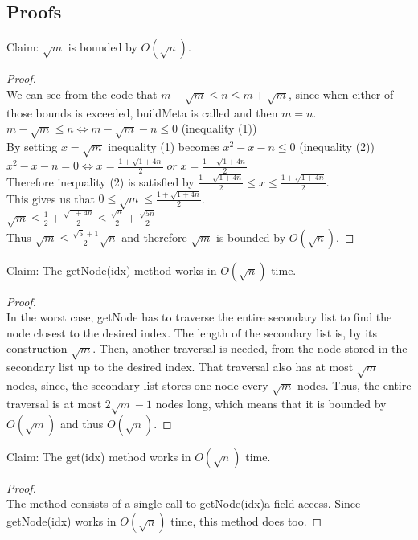 \documentclass[10pt]{article}
\begin{document}
\subsection{Proofs}
Claim: $\sqrt{m}$ is bounded by $O(\sqrt{n})$.
\begin{proof}
	$ $\\
	We can see from the code that $m - \sqrt{m} \leq n \leq m + \sqrt{m}$, since when either of those bounds is exceeded, buildMeta is called and then $m = n$.\\
	$m - \sqrt{m} \leq n \iff m - \sqrt{m} - n \leq 0$ (inequality (1))\\
	By setting $x = \sqrt{m}$ inequality (1) becomes $x^2 - x - n \leq 0$ (inequality (2))\\
	$x^2 - x - n = 0 \iff x = \frac{1 + \sqrt{1 + 4n}}{2} \; or \; x = \frac{1 - \sqrt{1 + 4n}}{2}$\\
	Therefore inequality (2) is satisfied by $\frac{1 - \sqrt{1 + 4n}}{2} \leq x \leq \frac{1 + \sqrt{1 + 4n}}{2}$.\\
	This gives us that $0 \leq \sqrt{m} \leq \frac{1 + \sqrt{1 + 4n}}{2}$.\\
	$\sqrt{m} \leq \frac{1}{2} + \frac{\sqrt{1 + 4n}}{2} \leq \frac{\sqrt{n}}{2} + \frac{\sqrt{5n}}{2}$\\
	Thus $\sqrt{m} \leq \frac{\sqrt{5} + 1}{2}\sqrt{n}$ and therefore $\sqrt{m}$ is bounded by $O(\sqrt{n})$.

\end{proof}

Claim: The getNode(idx) method works in $O(\sqrt{n})$ time.
\begin{proof}
	$ $\\
	In the worst case, getNode has to traverse the entire secondary list to find the node closest to the desired index. The length of the secondary list is, by its construction $\sqrt{m}$. Then, another traversal is needed, from the node stored in the secondary list up to the desired index. That traversal also has at most $\sqrt{m}$ nodes, since, the secondary list stores one node every $\sqrt{m}$ nodes. Thus, the entire traversal is at most $2\sqrt{m} - 1$ nodes long, which means that it is bounded by $O(\sqrt{m})$ and thus $O(\sqrt{n})$.
\end{proof}

Claim: The get(idx) method works in $O(\sqrt{n})$ time.
\begin{proof}
	$ $\\
	The method consists of a single call to getNode(idx)a field access. Since getNode(idx) works in $O(\sqrt{n})$ time, this method does too.
\end{proof}
\end{document}
